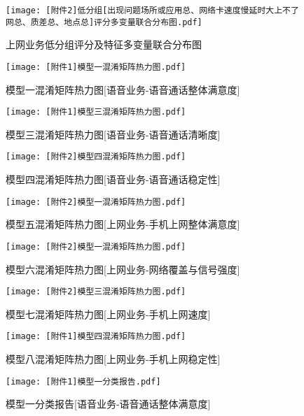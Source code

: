\documentclass{MathorCupmodeling}
\begin{document}
	\begin{figure}[H]
		\centering
			\centering
			\texttt{[image: [附件2]低分组[出现问题场所或应用总、网络卡速度慢延时大上不了网总、质差总、地点总]评分多变量联合分布图.pdf]}
			\caption{上网业务低分组评分及特征多变量联合分布图}
			\label{fig:上网业务低分组评分及特征多变量联合分布图}
	\end{figure}
	\begin{figure}[H]
		\centerline{\texttt{[image: [附件1]模型一混淆矩阵热力图.pdf]}}
		\caption{模型一混淆矩阵热力图[语音业务-语音通话整体满意度]}\label{fig:FirstModelConfusionMatrix}
	\end{figure}
	\begin{figure}[H]
		\centerline{\texttt{[image: [附件1]模型三混淆矩阵热力图.pdf]}}
		\caption{模型三混淆矩阵热力图[语音业务-语音通话清晰度]}\label{fig:ThirdModelConfusionMatrix}
	\end{figure}
	\begin{figure}[H]
		\centerline{\texttt{[image: [附件2]模型四混淆矩阵热力图.pdf]}}
		\caption{模型四混淆矩阵热力图[语音业务-语音通话稳定性]}\label{fig:FourthModelConfusionMatrix}
	\end{figure}
	\begin{figure}[H]
		\centerline{\texttt{[image: [附件2]模型一混淆矩阵热力图.pdf]}}
		\caption{模型五混淆矩阵热力图[上网业务-手机上网整体满意度]}\label{fig:FifthModelConfusionMatrix}
	\end{figure}
	\begin{figure}[H]
		\centerline{\texttt{[image: [附件2]模型一混淆矩阵热力图.pdf]}}
		\caption{模型六混淆矩阵热力图[上网业务-网络覆盖与信号强度]}\label{fig:SixthModelConfusionMatrix}
	\end{figure}
	\begin{figure}[H]
		\centerline{\texttt{[image: [附件2]模型三混淆矩阵热力图.pdf]}}
		\caption{模型七混淆矩阵热力图[上网业务-手机上网速度]}\label{fig:SeventhModelConfusionMatrix}
	\end{figure}
	\begin{figure}[H]
		\centerline{\texttt{[image: [附件1]模型四混淆矩阵热力图.pdf]}}
		\caption{模型八混淆矩阵热力图[上网业务-手机上网稳定性]}\label{fig:EighthModelConfusionMatrix}
	\end{figure}
	\begin{figure}[H]
		\centerline{\texttt{[image: [附件1]模型一分类报告.pdf]}}
		\caption{模型一分类报告[语音业务-语音通话整体满意度]}\label{fig:FirstModelClassificationReport}
	\end{figure}
\end{document}

